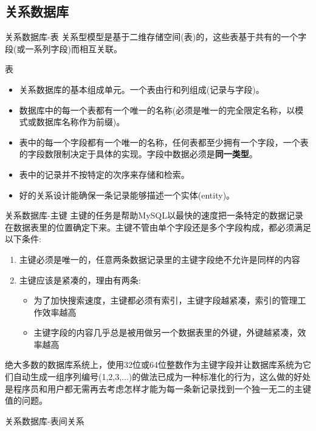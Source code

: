 \documentclass[CJK]{beamer}
\begin{document}
\begin{CJK*}{UTF8}{gbsn}
\subsection{关系数据库}
\begin{frame}{关系数据库-表}
关系型模型是基于二维存储空间(表)的，这些表基于共有的一个字段(或一系列字段)而相互关联。
	\begin{block}{表}
		\begin{itemize}
		\item 关系数据库的基本组成单元。一个表由行和列组成(记录与字段)。
		\item 数据库中的每一个表都有一个唯一的名称(必须是唯一的完全限定名称，以模式或数据库名称作为前缀)。
		\item 表中的每一个字段都有一个唯一的名称，任何表都至少拥有一个字段，一个表的字段数限制决定于具体的实现。字段中数据必须是{\bf 同一类型}。
		\item 表中的记录并不按特定的次序来存储和检索。
		\item 好的关系设计能确保一条记录能够描述一个实体(entity)。
		\end{itemize}
	\end{block}	
\end{frame}
{\tiny
\begin{frame}{关系数据库-主键}
主键的任务是帮助MySQL以最快的速度把一条特定的数据记录在数据表里的位置确定下来。主键不管由单个字段还是多个字段构成，都必须满足以下条件:
	\begin{block}{}
		\begin{enumerate}
			\item 主键必须是唯一的，任意两条数据记录里的主键字段绝不允许是同样的内容
			\item 主键应该是紧凑的，理由有两条:
			\begin{itemize}
				\item {\tiny 为了加快搜索速度，主键都必须有索引，主键字段越紧凑，索引的管理工作效率越高}
				\item {\tiny 主键字段的内容几乎总是被用做另一个数据表里的外键，外键越紧凑，效率越高}
			\end{itemize}
		\end{enumerate}
		绝大多数的数据库系统上，使用32位或64位整数作为主键字段并让数据库系统为它们自动生成一组序列编号(1,2,3,...)的做法已成为一种标准化的行为，这么做的好处是{\color{blue}程序员和用户都无需再去考虑怎样才能为每一条新记录找到一个独一无二的主键值的问题}。
	\end{block}
\end{frame}
}
\begin{frame}{关系数据库-表间关系}

\end{frame}
\end{CJK*}
\end{document}
